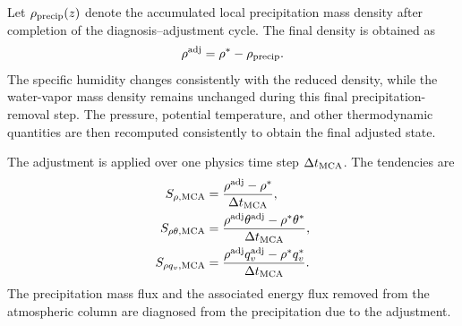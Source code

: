 Let $\rho_{\rm precip}(z)$ denote the accumulated local precipitation mass density after completion of the diagnosis--adjustment cycle.
The final density is obtained as
\begin{align*}
\rho^{\rm adj} = \rho^* - \rho_{\rm precip}.
\end{align*}
The specific humidity changes consistently with the reduced density, 
while the water-vapor mass density remains unchanged during this final precipitation-removal step.
The pressure, potential temperature, and other thermodynamic quantities are then recomputed consistently to obtain the final adjusted state.


The adjustment is applied over one physics time step $\Delta t_{\rm MCA}$.
The tendencies are
%
\begin{align}
 S_{\rho,{\rm MCA}}
 &=
 \frac{\rho^{\rm adj}-\rho^*}{\Delta t_{\rm MCA}},
 \\
 S_{\rho\theta,{\rm MCA}}
 &=
 \frac{ \rho^{\rm adj}\theta^{\rm adj} - \rho^*\theta^* } {\Delta t_{\rm MCA}},
 \\
 S_{\rho q_v,{\rm MCA}}
 &=
 \frac{ \rho^{\rm adj}q_v^{\rm adj} - \rho^*q_v^* } {\Delta t_{\rm MCA}} .
 \label{eq:mca_tendencies}
\end{align}
%
The precipitation mass flux and the associated energy flux removed from the atmospheric column are diagnosed from the precipitation due to the adjustment.


